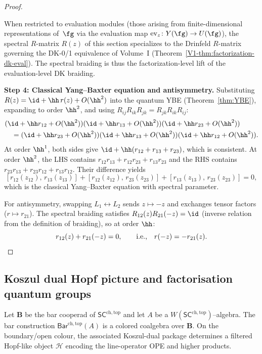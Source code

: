 \begin{proof}
\begin{remark}
When restricted to evaluation modules (those arising from
finite-dimensional representations of~$\fg$ via the evaluation map
$\mathrm{ev}_z \colon Y(\fg) \to U(\fg)$), the spectral $R$-matrix
$R(z)$ of this section specializes to the Drinfeld $R$-matrix
governing the DK-0/1 equivalence of Volume~I
(Theorem~\ref*{V1-thm:factorization-dk-eval}). The spectral braiding
is thus the factorization-level lift of the evaluation-level DK
braiding.
\end{remark}

\medskip
\noindent\textbf{Step 4: Classical Yang--Baxter equation and antisymmetry.}
Substituting $R(z) = \id + \hh\, r(z) + O(\hh^2)$ into the quantum YBE (Theorem~\ref{thm:YBE}), expanding to order $\hh^2$, and using $R_{ij} R_{ik} R_{jk} = R_{jk} R_{ik} R_{ij}$:
\begin{align*}
&(\id + \hh r_{12} + O(\hh^2))(\id + \hh r_{13} + O(\hh^2))(\id + \hh r_{23} + O(\hh^2)) \\
&\quad = (\id + \hh r_{23} + O(\hh^2))(\id + \hh r_{13} + O(\hh^2))(\id + \hh r_{12} + O(\hh^2)).
\end{align*}
At order $\hh^1$, both sides give $\id + \hh(r_{12} + r_{13} + r_{23})$, which is consistent. At order $\hh^2$, the LHS contains $r_{12}r_{13} + r_{12}r_{23} + r_{13}r_{23}$ and the RHS contains $r_{23}r_{13} + r_{23}r_{12} + r_{13}r_{12}$. Their difference yields
\[
[r_{12}(z_{12}),\, r_{13}(z_{13})] + [r_{12}(z_{12}),\, r_{23}(z_{23})] + [r_{13}(z_{13}),\, r_{23}(z_{23})] = 0,
\]
which is the classical Yang--Baxter equation with spectral parameter.

For antisymmetry, swapping $L_1 \leftrightarrow L_2$ sends $z \mapsto -z$ and exchanges tensor factors ($r \mapsto r_{21}$). The spectral braiding satisfies $R_{12}(z) R_{21}(-z) = \id$ (inverse relation from the definition of braiding), so at order $\hh$:
\[
r_{12}(z) + r_{21}(-z) = 0, \qquad\text{i.e.,}\quad r(-z) = -r_{21}(z). \qedhere
\]
\end{proof}

\subsection{Koszul dual Hopf picture and factorisation quantum groups}
Let $\mathbf B$ be the bar cooperad of $\mathsf{SC}^{\mathrm{ch,top}}$ and let $A$ be a $W(\mathsf{SC}^{\mathrm{ch,top}})$–algebra.
The bar construction $\mathsf{Bar}^{\mathrm{ch,top}}(A)$ is a colored coalgebra over $\mathbf B$. On the boundary/open colour, the associated Koszul-dual package determines a filtered Hopf-like object $\mathcal H$ encoding the line-operator OPE and higher products.

